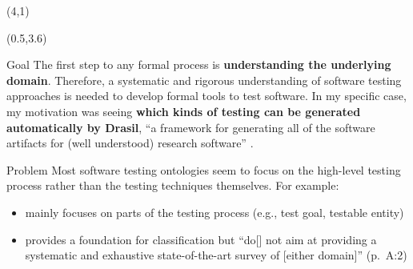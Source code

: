 \documentclass[22pt]{beamer}
\begin{document}
\begin{frame}[fragile]
    \begin{textblock}{8}(4,1)
        \titlepage
    \end{textblock}

    \begin{textblock}{7.25}(0.5,3.6)

        \begin{block}{\fontsize{37}{20}\selectfont Goal}
            The first step to any formal process is \textbf{understanding the
                underlying domain}. Therefore, a systematic and rigorous
            understanding of software testing approaches is needed to develop formal
            tools to test software. In my specific case, my motivation was seeing
            \textbf{which kinds of testing can be generated automatically by Drasil},
            ``a framework for generating all of the software artifacts for
            (well understood) research software'' \cite{carette_drasil_2021}.
            \vspace{5mm}
        \end{block}

        \begin{block}{\fontsize{37}{20}\selectfont Problem}
            Most software testing ontologies seem to focus on the high-level
            testing process rather than the testing techniques themselves. For
            example:
            \begin{itemize}
                \item \cite{TebesEtAl2020a} mainly focuses on parts of the
                      testing process (e.g., test goal, testable entity)
                \item \cite{UnterkalmsteinerEtAl2014} provides a foundation for
                      classification but ``do[] not aim at providing a systematic
                      and exhaustive state-of-the-art survey of [either domain]''
                      (p.~A:2)
            \end{itemize}
            \vspace{5mm}
        \end{block}


\end{textblock}
\end{frame}
\end{document}
